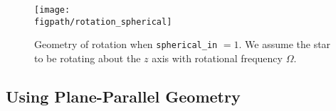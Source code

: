 \begin{figure}[tpb]
\hspace{-0.25in}
\centering
\texttt{[image: \\figpath/rotation\_spherical]}
\begin{minipage}[h]{2.0in}
\vspace{-4in}
\caption{Geometry of rotation when {\tt spherical\_in} $=1$.  We assume the 
star to be rotating about the $z$ axis with rotational frequency $\Omega$.}
\end{minipage}
\label{Fig:rotation in spherical}
\end{figure}

\subsection{Using Plane-Parallel Geometry}\label{Sec:Using Plane-Parallel Geometry}
